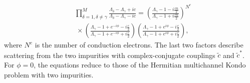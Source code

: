 \documentclass[aps,  prb,twocolumn,
  superscriptaddress,  floatfix,  10pt         
]{revtex4-2}
\begin{document}
\begin{align}
&\prod_{\delta=1,\delta\neq\gamma}^{M}
\frac{\Lambda_{\delta}-\Lambda_{\gamma}+ic}
     {\Lambda_{\delta}-\Lambda_{\gamma}-ic}
=
\left(
\frac{\Lambda_{\gamma}-1-i\frac{cn}{2}}
     {\Lambda_{\gamma}-1+i\frac{cn}{2}}
\right)^{N^e}
\nonumber\\
&~\times
\left(
\frac{\Lambda_{\gamma}-1+e^{-i\phi}-i\frac{c}{2}}
     {\Lambda_{\gamma}-1+e^{-i\phi}+i\frac{c}{2}}
\right)
\left(
\frac{\Lambda_{\gamma}-1+e^{i\phi}-i\frac{c}{2}}
     {\Lambda_{\gamma}-1+e^{i\phi}+i\frac{c}{2}}
\right),
\end{align}
where $N^e$ is the number of conduction electrons. The last two factors describe scattering from the two impurities with complex-conjugate couplings
$ \tilde c $ and $ \tilde c^{*}$. For $\phi=0$, the equations reduce to those of the Hermitian multichannel Kondo problem with two impurities.
\end{document}
